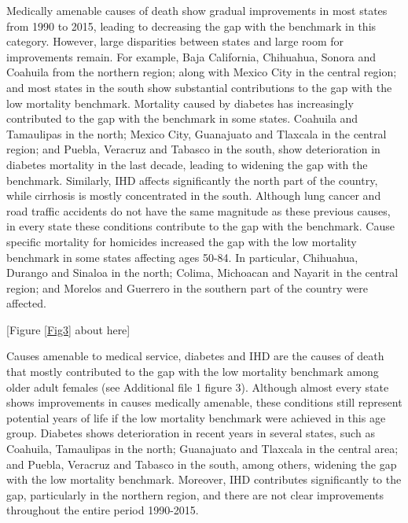 \documentclass{bmcart}
\begin{document}
Medically amenable causes of death show gradual improvements in most states from 1990 to 2015, leading to decreasing the gap with the benchmark in this category. However, large disparities between states and large room for improvements remain. For example, Baja California, Chihuahua, Sonora and Coahuila from the northern region; along with Mexico City in the central region; and most states in the south show substantial contributions to the gap with the low mortality benchmark. Mortality caused by diabetes has increasingly contributed to the gap with the benchmark in some states. Coahuila and Tamaulipas in the north; Mexico City, Guanajuato and Tlaxcala in the central region; and Puebla, Veracruz and Tabasco in the south, show deterioration in diabetes mortality in the last decade, leading to widening the gap with the benchmark. Similarly, IHD affects significantly the north part of the country, while cirrhosis is mostly concentrated in the south. Although lung cancer and road traffic accidents do not have the same magnitude as these previous causes, in every state these conditions contribute to the gap with the benchmark. Cause specific mortality for homicides increased the gap with the low mortality benchmark in some states affecting ages 50-84. In particular, Chihuahua, Durango and Sinaloa in the north; Colima, Michoacan and Nayarit in the central region; and Morelos and Guerrero in the southern part of the country were affected.

\begin{center}
[Figure \ref{Fig3} about here]
\end{center}

Causes amenable to medical service, diabetes and IHD are the causes of death that mostly contributed to the gap with the low mortality benchmark among older adult females (see Additional file 1 figure 3). Although almost every state shows improvements in causes medically amenable, these conditions still represent potential years of life if the low mortality benchmark were achieved in this age group. Diabetes shows deterioration in recent years in several states, such as Coahuila, Tamaulipas in the north; Guanajuato and Tlaxcala in the central area; and Puebla, Veracruz and Tabasco in the south, among others, widening the gap with the low mortality benchmark. Moreover, IHD contributes significantly to the gap, particularly in the northern region, and there are not clear improvements throughout the entire period 1990-2015.
\end{document}
